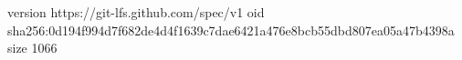 version https://git-lfs.github.com/spec/v1
oid sha256:0d194f994d7f682de4d4f1639c7dae6421a476e8bcb55dbd807ea05a47b4398a
size 1066
